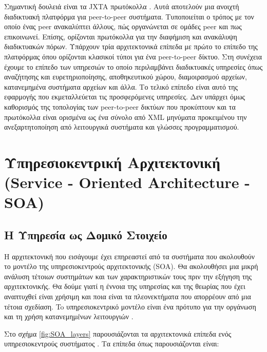 Σημαντική δουλειά είναι τα JXTA πρωτόκολλα \citep{JXTA2007}. Αυτά 
αποτελούν μια ανοιχτή διαδικτυακή πλατφόρμα για peer-to-peer συστήματα. 
Τυποποιείται ο τρόπος με τον οποίο ένας peer ανακαλύπτει άλλους, πώς 
οργανώνεται σε ομάδες peer και πως επικοινωνεί. Επίσης, ορίζονται 
πρωτόκολλα για την διαφήμιση και ανακάλυψη διαδικτυακών πόρων. Υπάρχουν 
τρία αρχιτεκτονικά επίπεδα με πρώτο το επίπεδο της πλατφόρμας όπου 
ορίζονται κλασικοί τύποι για ένα peer-to-peer δίκτυο. Στη συνέχεια 
έχουμε το επίπεδο των υπηρεσιών το οποίο περιλαμβάνει διαδικτυακές 
υπηρεσίες όπως αναζήτησης και ευρετηριοποίησης, αποθηκευτικού χώρου, 
διαμοιρασμού αρχείων, κατανεμημένα συστήματα αρχείων και άλλα. Το τελικό 
επίπεδο είναι αυτό της εφαρμογής που εκμεταλλεύεται τις προσφερόμενες 
υπηρεσίες. Δεν υπάρχει όμως καθορισμός της τοπολογίας των peer-to-peer 
δικτύων που προκύπτουν και τα πρωτόκολλα είναι ορισμένα ως ένα σύνολο 
από XML μηνύματα προκειμένου την ανεξαρτητοποίηση από λειτουργικά 
συστήματα και γλώσσες προγραμματισμού.

\section[Υπηρεσιοκεντρική Αρχιτεκτονική]{Υπηρεσιοκεντρική Αρχιτεκτονική (Service - Oriented Architecture - SOA)}
\label{sec:SOA}

\subsection{Η Υπηρεσία ως Δομικό Στοιχείο}

Η αρχιτεκτονική που εισάγουμε έχει επηρεαστεί από τα συστήματα που 
ακολουθούν το μοντέλο της υπηρεσιοκεντρούς αρχιτεκτονικής (SOA). Θα 
ακολουθήσει μια μικρή ανάλυση τέτοιων συστημάτων και των χαρακτηριστικών 
τους πριν την εξήγηση της αρχιτεκτονικής. Θα δούμε γιατί η έννοια της 
υπηρεσίας και της θεωρίας που έχει αναπτυχθεί είναι χρήσιμη και ποια 
είναι τα πλεονεκτήματα που απορρέουν από μια τέτοια σχεδίαση. To 
υπηρεσιοκεντρικό μοντέλο είναι ένα πρότυπο για την οργάνωση και τη χρήση 
κατανεμημένων λειτουργιών \citep{OASIS-soa-rm}. 

Στο σχήμα \ref{fig:SOA_layers} παρουσιάζονται τα αρχιτεκτονικά επίπεδα ενός 
υπηρεσιοκεντρούς συστήματος \citep{Bianco2011}. Τα επίπεδα όπως παρουσιάζονται είναι:


